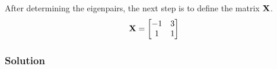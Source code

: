 After determining the eigenpairs, the next step is to define the matrix $\mathbf{X}$.
\begin{equation*}
    \mathbf{X} = 
    \begin{bmatrix}
        -1 & 3 \\
         1 & 1
    \end{bmatrix} 
\end{equation*} 


\subsubsection*{Solution}
